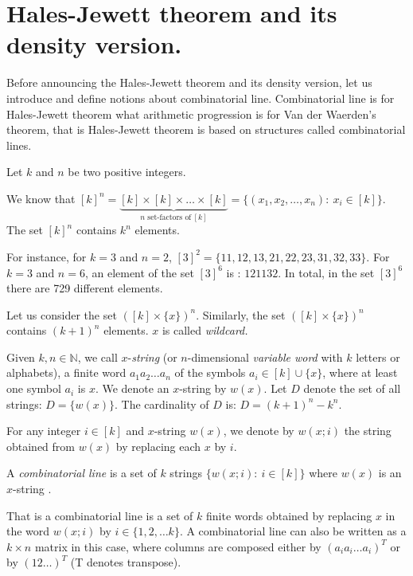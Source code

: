 \section{Hales-Jewett theorem and its density version.} \label{hjt}

Before announcing the Hales-Jewett theorem and its density version, let us introduce and define notions about combinatorial line.  Combinatorial line is for Hales-Jewett theorem what arithmetic progression is for Van der Waerden's theorem, that is Hales-Jewett theorem is based on structures called combinatorial lines.

Let $k$ and $n$  be two positive integers. 

We know that $[k]^n= \underbrace{[k] \times [k] \times \ldots \times [k]}_{n \text{ set-factors  of}\  [k]}=\{(x_1,x_2,\ldots, x_n):\ x_i \in [k] \}.$ The set $[k]^n$ contains $k^n$ elements.

For instance, for $k=3$ and $n=2$, $[3]^2=\{11,12,13,21,22,23,31,32,33\}.$ For $k=3$ and $n=6$, an element of the set $[3]^6$ is : $121132.$ In total, in the set $[3]^6$ there are  729 different elements.

Let us consider the set $([k]\times \{x\})^n.$ Similarly, the set $([k]\times \{x\})^n$ contains $(k+1)^n$ elements. $x$ is called \textit{wildcard.}



Given ${k,n\in{\mathbb N}}$, we call $x$-\textit{string} (or ${n}$-dimensional \textit{variable word} with ${k}$ letters or alphabets),  a finite word $a_1a_2\ldots a_n$ of the symbols
$a_i \in [k] \cup \{x\}$, where at least one symbol $a_i$ is $x.$ We denote an $x$-string by $w(x)$. Let $D$ denote  the set of all strings: $D=\{w(x)\}$. The cardinality of $D$ is: $D=(k+1)^n-k^n.$ 

For any integer $i \in [k]$ and $x$-string $w(x)$, we  denote by $w(x;i)$ the string obtained from $w(x)$ by replacing each $x$ by $i.$
 \begin{defn}
A \textit{combinatorial line} is a set of $k$ strings $\{w(x;i): \  i\in [k] \}$ where $w(x)$ is an $x$-string %
.\end{defn}
 That is a combinatorial line is a set of $k$ finite words obtained by replacing $x$ in the word $w(x;i)$ by $i \in \{1,2, \ldots k\}.$ A combinatorial line can also be written as a $k \times n$ matrix in this case, where columns are composed either by $(a_ia_i\ldots a_i)^T$ or by  $(12\ldots )^T$ (T denotes transpose).

